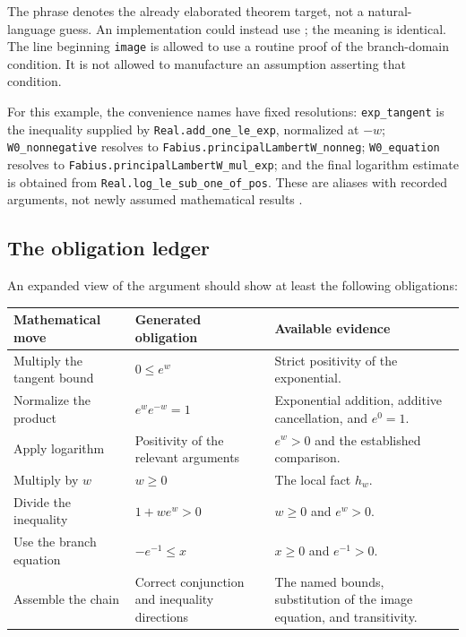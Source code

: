 \documentclass[11pt,a4paper]{article}
\newcommand{\codeid}[1]{\nolinkurl{#1}}
\begin{document}
The phrase \texttt{} denotes the already elaborated theorem target, not a natural-language guess. An implementation could instead use \texttt{}; the meaning is identical. The line beginning \codeid{image} is allowed to use a routine proof of the branch-domain condition. It is not allowed to manufacture an assumption asserting that condition.

For this example, the convenience names have fixed resolutions: \codeid{exp_tangent} is the inequality supplied by \codeid{Real.add_one_le_exp}, normalized at $-w$; \codeid{W0_nonnegative} resolves to \codeid{Fabius.principalLambertW_nonneg}; \codeid{W0_equation} resolves to \codeid{Fabius.principalLambertW_mul_exp}; and the final logarithm estimate is obtained from \codeid{Real.log_le_sub_one_of_pos}. These are aliases with recorded arguments, not newly assumed mathematical results \cite{srclambert}.

\subsection{The obligation ledger}

An expanded view of the argument should show at least the following obligations:
\begin{center}
\small
\begin{tabularx}{\textwidth}{@{}>{\raggedright\arraybackslash}p{}YY@{}}
\toprule
Mathematical move & Generated obligation & Available evidence \\
\midrule
Multiply the tangent bound & $0\le e^w$ & Strict positivity of the exponential. \\
Normalize the product & $e^we^{-w}=1$ & Exponential addition, additive cancellation, and $e^0=1$. \\
Apply logarithm & Positivity of the relevant arguments & $e^w>0$ and the established comparison. \\
Multiply by $w$ & $w\ge0$ & The local fact $h_w$. \\
Divide the inequality & $1+w e^w>0$ & $w\ge0$ and $e^w>0$. \\
Use the branch equation & $-e^{-1}\le x$ & $x\ge0$ and $e^{-1}>0$. \\
Assemble the chain & Correct conjunction and inequality directions & The named bounds, substitution of the image equation, and transitivity. \\
\bottomrule
\end{tabularx}
\end{center}
\end{document}
